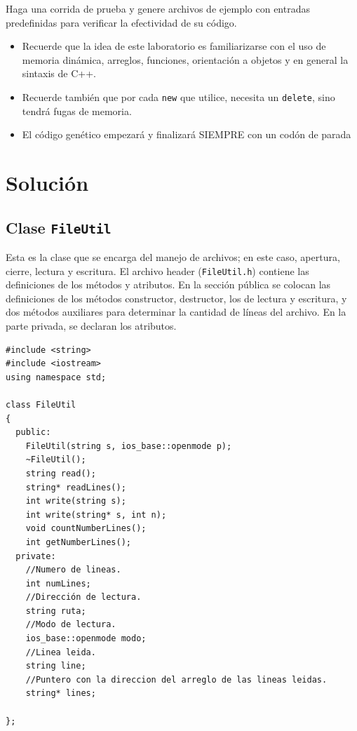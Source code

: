 Haga una corrida de prueba y genere archivos de ejemplo con entradas predefinidas para verificar la efectividad de su código.

\begin{itemize}
\item Recuerde que la idea de este laboratorio es familiarizarse con el uso de memoria dinámica, arreglos, funciones, orientación a objetos y en general la sintaxis de C++.
\item Recuerde también que por cada \texttt{new} que utilice, necesita un \texttt{delete}, sino tendrá fugas de memoria.
\item El código genético empezará y finalizará SIEMPRE con un codón de parada
\end{itemize}

\newpage

\section{Solución}

\subsection{Clase \texttt{FileUtil}}
Esta es la clase que se encarga del manejo de archivos; en este caso, apertura, cierre, lectura y escritura. El archivo header (\texttt{FileUtil.h}) contiene las definiciones de los métodos y atributos. En la sección pública se colocan las definiciones de los métodos constructor, destructor, los de lectura y escritura, y dos métodos auxiliares para determinar la cantidad de líneas del archivo. En la parte privada, se declaran los atributos.


\begin{verbatim}
#include <string>
#include <iostream>
using namespace std;

class FileUtil
{
  public:
  	FileUtil(string s, ios_base::openmode p);
  	~FileUtil();
  	string read();
  	string* readLines();
  	int write(string s);
  	int write(string* s, int n);
    void countNumberLines();
    int getNumberLines();
  private:
    //Numero de lineas.
    int numLines;
    //Dirección de lectura.
    string ruta;
    //Modo de lectura.
  	ios_base::openmode modo;
    //Linea leida.
    string line;
    //Puntero con la direccion del arreglo de las lineas leidas.
    string* lines;

};
\end{verbatim}

